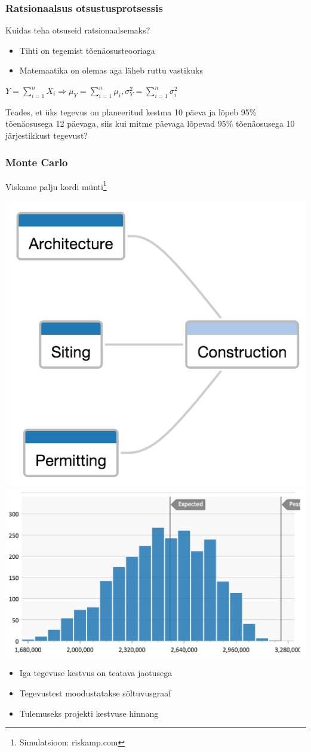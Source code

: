 \begin{frame}[fragile]
	\frametitle{Ratsionaalsus otsustusprotsessis}
	Kuidas teha otsuseid ratsionaalsemaks?
	\begin{itemize}
		\item Tihti on tegemist tõenäosusteooriaga
		\item Matemaatika on olemas aga läheb ruttu vastikuks
	\end{itemize}
\begin{center}
	$Y=\sum_{i=1}^nX_i \Rightarrow \mu_Y=\sum_{i=1}^n\mu_i, \sigma_Y^2=\sum_{i=1}^n\sigma_i^2$
	\end{center}
	Teades, et üks tegevus on planeeritud kestma 10 päeva ja lõpeb 95\% tõenäosusega 12 päevaga, siis kui mitme päevaga lõpevad 95\% tõenäosusega 10 järjestikkust tegevust? 
	
\end{frame}

\begin{frame}[fragile]
  \frametitle{Monte Carlo}
  Viskame palju kordi münti\footnote{Simulatsioon: riskamp.com}
  	\begin{center}
			\includegraphics[width=.3\textwidth]{graaf.png}			\includegraphics[width=.5\textwidth]{jaotus.png}
	\end{center}
	\begin{itemize}
		\item Iga tegevuse kestvus on teatava jaotusega
		\item Tegevustest moodustatakse sõltuvusgraaf
		\item Tulemuseks projekti kestvuse hinnang
	\end{itemize}

\end{frame}


